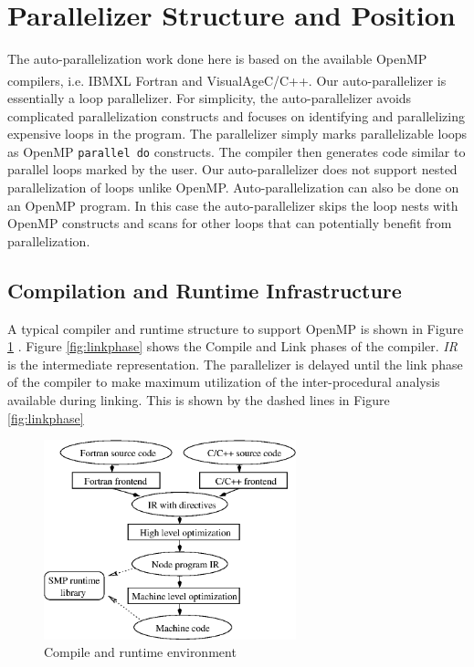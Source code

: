 \section{Parallelizer Structure and Position}
\label{par_structure}
   
The auto-parallelization work done here is based on the available
OpenMP compilers, i.e. IBM\textsuperscript \textregistered XL Fortran and VisualAge\textsuperscript \textregistered C/C++. Our
auto-parallelizer is essentially a loop parallelizer.  For simplicity,
the auto-parallelizer avoids complicated parallelization constructs
and focuses on identifying and parallelizing expensive loops in the
program. The parallelizer simply marks parallelizable loops as OpenMP
\texttt{parallel do} constructs. The compiler then generates code
similar to parallel loops marked by the user. Our auto-parallelizer
does not support nested parallelization of loops unlike OpenMP.
Auto-parallelization can also be done on an OpenMP program. In this
case the auto-parallelizer skips the loop nests with OpenMP constructs
and scans for other loops that can potentially benefit from
parallelization.

\subsection{Compilation and Runtime Infrastructure}

A typical compiler and runtime structure to support OpenMP is shown in
Figure \ref{fig:runtime} \cite{Zha04}. Figure \ref{fig:linkphase}
shows the Compile and Link phases of the compiler. \emph{IR} is the
intermediate representation. The parallelizer is delayed until the
link phase of the compiler to make maximum utilization of the
inter-procedural analysis available during linking. This is shown by
the dashed lines in Figure \ref{fig:linkphase}

\begin{figure}[h]
  \begin{center}
    \includegraphics[angle=0, width=0.65\textwidth]{runtime.eps}
    \caption{\footnotesize Compile and runtime environment}
    \label{fig:runtime}
  \end{center}
\end{figure}


